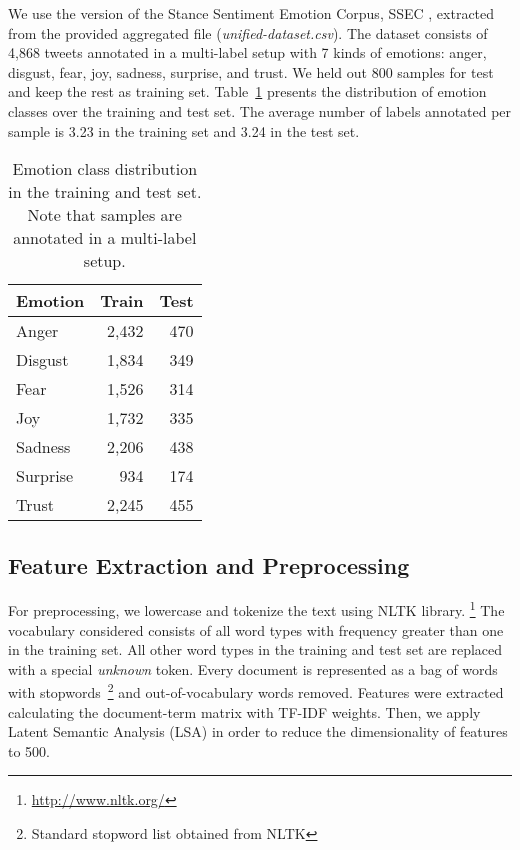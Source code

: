 \documentclass[11pt,a4paper]{article}
\begin{document}
We use the version of the Stance Sentiment Emotion Corpus, SSEC \cite{schuff2017annotation},  extracted from the provided aggregated file ({\it unified-dataset.csv}).
The dataset consists of 4,868 tweets annotated in a multi-label setup with 7 kinds of emotions: anger, disgust, fear, joy,  sadness, surprise, and trust.
We held out 800 samples for test and keep the rest as training set.
Table~\ref{table:corpus-stats}  presents the distribution of emotion classes over the training and test set. The average number of labels annotated per sample is 3.23 in the training set and 3.24 in the test set.


\begin{table}[]
\centering
\begin{tabular}{|l|r|r|}
\hline
Emotion  & \multicolumn{1}{c|}{Train} & \multicolumn{1}{c|}{Test} \\ \hline
Anger    & 2,432                      & 470                       \\ \hline
Disgust  & 1,834                      & 349                       \\ \hline
Fear     & 1,526                      & 314                       \\ \hline
Joy      & 1,732                      & 335                       \\ \hline
Sadness  & 2,206                      & 438                       \\ \hline
Surprise & 934                        & 174                       \\ \hline
Trust    & 2,245                      & 455                       \\ \hline
\end{tabular}
\caption{Emotion class distribution in the training and test set. Note that samples are annotated in a multi-label setup.}
\label{table:corpus-stats}
\end{table}

\subsection{Feature Extraction and Preprocessing}

For preprocessing, we lowercase and tokenize the text using NLTK library. \footnote{\url{http://www.nltk.org/}}
The vocabulary considered consists of all word types with frequency greater than one in the training set. All other word types in the training and test set are replaced with a special {\it unknown} token.
Every document is represented as a bag of words with stopwords~\footnote{Standard stopword list obtained from NLTK} and out-of-vocabulary words removed.
Features were extracted calculating the document-term matrix with TF-IDF weights. Then, we apply Latent Semantic Analysis (LSA) in order to reduce the dimensionality of features to 500.
\end{document}
